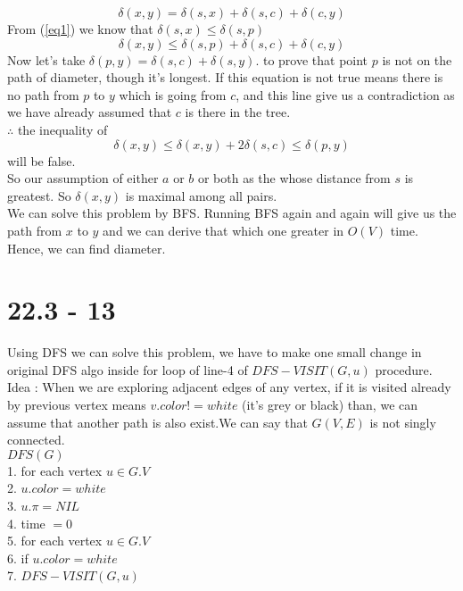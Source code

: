 \documentclass[a4paper, 11pt]{article}
\begin{document}
$$\delta(x,y) = \delta(s,x) + \delta(s,c) + \delta(c,y)$$
From (\ref{eq1}) we know that $\delta(s,x) \le \delta(s,p)$
$$\delta(x,y) \leq \delta(s,p) + \delta(s,c) + \delta(c,y)$$
Now let's take $\delta(p,y) = \delta(s,c) + \delta(s,y).$ to prove that point $p$ is not on the path of diameter, though it's longest. If this equation is not true means there is no path from $p$ to $y$ which is going from $c$, and this line give us a contradiction as we have already assumed that $c$ is there in the tree.\\
$\therefore$ the inequality of
$$\delta(x,y) \le \delta(x,y) + 2 \delta(s,c) \le \delta(p,y)$$
will be false.\\
So our assumption of either $a$ or $b$ or both as the whose distance from $s$ is greatest. So $\delta(x,y)$ is maximal among all pairs.\\
We can solve this problem by BFS. Running BFS again and again will give us the path from $x$ to $y$ and we can derive that which one greater in $O(V)$ time. Hence, we can find diameter.

\section{22.3 - 13}
Using DFS we can solve this problem, we have to make one small change in original DFS algo inside for loop of line-4 of $DFS-VISIT(G,u)$ procedure.\\
Idea : When we are exploring adjacent edges of any vertex, if it is visited already by previous vertex means $v.color != white $ (it's grey or black) than, we can assume that another path is also exist.We can say that $G(V,E)$ is not singly connected.\\
$DFS(G)$\\
1. for each vertex $ u  \in  G.V $\\
2. \hspace{0.7cm} $u.color = white$\\
3. \hspace{0.7cm} $u.\pi = NIL$\\
4. time $ = 0$\\
5. for each vertex $ u  \in  G.V $\\
6. \hspace{0.7cm} if $u.color = white$\\
7. \hspace{1.4 cm} $DFS-VISIT ( G,u )$
\end{document}
